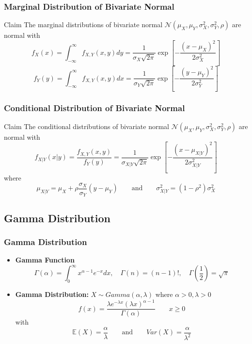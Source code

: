 \documentclass[serif,mathserif,professionalfont]{beamer}
\begin{document}
\begin{frame}
	
	\frametitle{Marginal Distribution of Bivariate Normal}
	
	\begin{block}{Claim}
		The marginal distributions of bivariate normal $ \mathcal{N}(\mu_X, \mu_Y, \sigma_X^2, \sigma_Y^2, \rho) $ are normal with
		$$ f_X (x) = \int_{- \infty}^{\infty} f_{X,Y}(x, y) dy = \frac{1}{\sigma_X \sqrt{2 \pi}} \exp \left[- \frac{(x-\mu_X)^2}{2 \sigma_X^2} \right] $$
		$$ f_Y (y) = \int_{- \infty}^{\infty} f_{X,Y}(x, y) dx = \frac{1}{\sigma_Y \sqrt{2 \pi}} \exp \left[- \frac{(y-\mu_Y)^2}{2 \sigma_Y^2} \right] $$
	\end{block}
	
	
\end{frame}


\begin{frame}
	
	\frametitle{Conditional Distribution of Bivariate Normal}
	
	\begin{block}{Claim}
		The conditional distributions of bivariate normal $ \mathcal{N}(\mu_X, \mu_Y, \sigma_X^2, \sigma_Y^2, \rho) $ are normal with
		$$ f_{X|Y} (x|y) = \frac{f_{X,Y}(x, y)}{f_Y(y)} = \frac{1}{\sigma_{X|Y} \sqrt{2 \pi}} \exp \left[- \frac{(x-\mu_{X|Y})^2}{2 \sigma_{X|Y}^2} \right] $$
		where
		$$ \mu_{X|Y} = \mu_X + \rho \frac{\sigma_X}{\sigma_Y} (y - \mu_Y) \qquad \text{and} \qquad \sigma_{X|Y}^2 = (1-\rho^2) \sigma_X^2 $$
	\end{block}
	
\end{frame}





\subsection{Gamma Distribution}


\begin{frame}
	
	\frametitle{Gamma Distribution}
	
	\begin{itemize}
		\item \textbf{Gamma Function}
		$$ \Gamma(\alpha) = \int_{0}^{\infty} x^{\alpha-1} e^{-x} dx, \quad \Gamma(n) = (n-1)!, \quad \Gamma \left(\frac{1}{2} \right) = \sqrt{\pi} $$
		\item \textbf{Gamma Distribution:} $ X \sim Gamma(\alpha, \lambda) $ where $ \alpha > 0, \lambda > 0 $
		$$ f(x) = \frac{\lambda e^{-\lambda x} (\lambda x)^{\alpha - 1}}{\Gamma(\alpha)} \qquad x \geq 0 $$
		with
		$$ \mathbb{E}(X) = \frac{\alpha}{\lambda} \qquad \text{and} \qquad Var(X) = \frac{\alpha}{\lambda^2} $$
	\end{itemize}
	
\end{frame}
\end{document}
